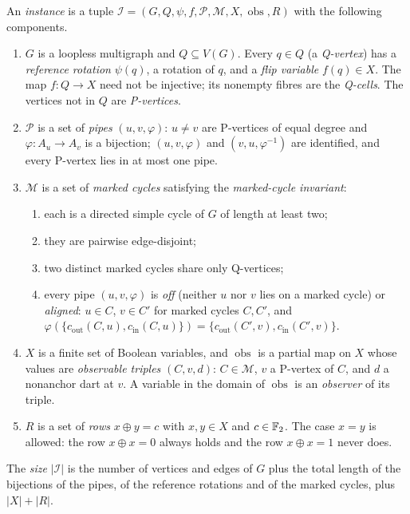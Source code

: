 \begin{definition}[instance]\label{def:v4-instance}
An \emph{instance} is a tuple
$\mathcal I=(G,Q,\psi,f,\mathcal P,\mathcal M,X,\operatorname{obs},R)$ with
the following components.
\begin{enumerate}[label=(\arabic*),nosep]
\item $G$ is a loopless multigraph and $Q\subseteq V(G)$. Every $q\in Q$ (a \emph{Q-vertex}) has a
  \emph{reference rotation} $\psi(q)$, a rotation of $q$, and a \emph{flip
  variable} $f(q)\in X$. The map $f:Q\to X$ need not be injective; its
  nonempty fibres are the \emph{Q-cells}. The vertices not in $Q$ are
  \emph{P-vertices}.
\item $\mathcal P$ is a set of \emph{pipes} $(u,v,\varphi)$: $u\ne v$ are
  P-vertices of equal degree and $\varphi:A_u\to A_v$ is a bijection;
  $(u,v,\varphi)$ and $(v,u,\varphi^{-1})$ are identified, and every
  P-vertex lies in at most one pipe.
\item $\mathcal M$ is a set of \emph{marked cycles} satisfying the
  \emph{marked-cycle invariant}:
  \begin{enumerate}[label=(M\arabic*),nosep]
  \item\label{it:v4-M1} each is a directed simple cycle of $G$ of length at
    least two;
  \item\label{it:v4-M2} they are pairwise edge-disjoint;
  \item\label{it:v4-M3} two distinct marked cycles share only Q-vertices;
  \item\label{it:v4-M4} every pipe $(u,v,\varphi)$ is \emph{off} (neither
    $u$ nor $v$ lies on a marked cycle) or \emph{aligned}: $u\in C$, $v\in C'$
    for marked cycles $C,C'$, and
    $\varphi(\{c_{\mathrm{out}}(C,u),c_{\mathrm{in}}(C,u)\})=
    \{c_{\mathrm{out}}(C',v),c_{\mathrm{in}}(C',v)\}$.
  \end{enumerate}
\item $X$ is a finite set of Boolean variables, and $\operatorname{obs}$ is a
  partial map on $X$ whose values are \emph{observable triples} $(C,v,d)$:
  $C\in\mathcal M$, $v$ a P-vertex of $C$, and $d$ a nonanchor dart at $v$. A
  variable in the domain of $\operatorname{obs}$ is an \emph{observer} of its
  triple.
\item $R$ is a set of \emph{rows} $x\oplus y=c$ with $x,y\in X$ and
  $c\in\mathbb F_2$. The case $x=y$ is allowed: the row $x\oplus x=0$ always holds
  and the row $x\oplus x=1$ never does.
\end{enumerate}
The \emph{size} $|\mathcal I|$ is the number of vertices and edges of $G$
plus the total length of the bijections of the pipes, of the reference
rotations and of the marked cycles, plus $|X|+|R|$.
\end{definition}

